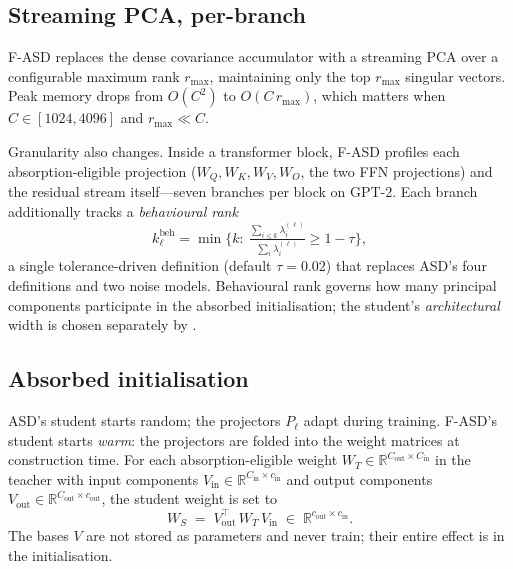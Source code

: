 \documentclass[11pt]{article}
\newcommand{\R}{\mathbb{R}}
\newcommand{\Vin}{V_{\mathrm{in}}}
\newcommand{\Vout}{V_{\mathrm{out}}}
\newcommand{\Wt}{W_T}
\newcommand{\Ws}{W_S}
\newcommand{\fasd}{\textsc{F-ASD}}
\newcommand{\asd}{\textsc{ASD}}
\begin{document}
\subsection{Streaming PCA, per-branch}
\label{sec:fasd:profile}

\fasd{} replaces the dense covariance accumulator with a streaming PCA
over a configurable maximum rank $r_{\max}$, maintaining only the top
$r_{\max}$ singular vectors. Peak memory drops from $O(C^2)$ to
$O(C\,r_{\max})$, which matters when $C \in [1024, 4096]$ and
$r_{\max}\!\ll\!C$.

Granularity also changes. Inside a transformer block, \fasd{} profiles
each absorption-eligible projection ($W_Q,W_K,W_V,W_O$, the two FFN
projections) and the residual stream itself---seven branches per block
on GPT-2. Each branch additionally tracks a \emph{behavioural rank}
\begin{equation}
\label{eq:beh-rank}
k^{\mathrm{beh}}_\ell = \min\!\Big\{k :\ \tfrac{\sum_{i\le k}\lambda_i^{(\ell)}}{\sum_i \lambda_i^{(\ell)}}\ge 1-\tau\Big\},
\end{equation}
a single tolerance-driven definition (default $\tau\!=\!0.02$) that
replaces \asd{}'s four definitions and two noise models. Behavioural
rank governs how many principal components participate in the absorbed
initialisation; the student's \emph{architectural} width is chosen
separately by .

\subsection{Absorbed initialisation}
\label{sec:fasd:absorb}

\asd{}'s student starts random; the projectors $P_\ell$ adapt during
training. \fasd{}'s student starts \emph{warm}: the projectors are folded
into the weight matrices at construction time. For each absorption-eligible
weight $\Wt \in \R^{C_{\mathrm{out}}\times C_{\mathrm{in}}}$ in the
teacher with input components
$\Vin \in \R^{C_{\mathrm{in}} \times c_{\mathrm{in}}}$ and output components
$\Vout \in \R^{C_{\mathrm{out}} \times c_{\mathrm{out}}}$, the student
weight is set to
\begin{equation}
\label{eq:absorb}
\boxed{\;\Ws \;=\; \Vout^\top \, \Wt \, \Vin \;\in\; \R^{c_{\mathrm{out}} \times c_{\mathrm{in}}}.\;}
\end{equation}
The bases $V$ are not stored as parameters and never train; their entire
effect is in the initialisation.
\end{document}
